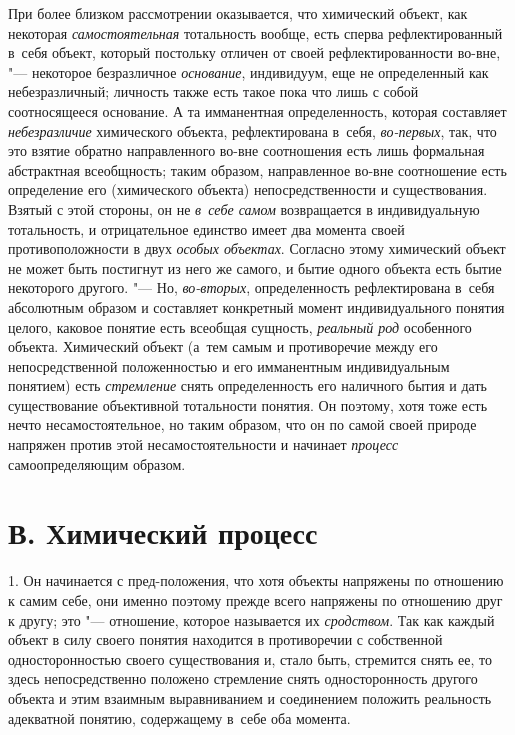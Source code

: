 При более близком рассмотрении оказывается, что химический
объект, как некоторая
{\em самостоятельная}
тотальность вообще, есть сперва рефлектированный в~себя
объект, который постольку отличен от своей рефлектированности во-вне, "---
некоторое безразличное
{\em основание},
индивидуум, еще не определенный как небезразличный; личность
также есть такое пока что лишь с собой соотносящееся
основание.
А та имманентная определенность, которая составляет
{\em небезразличие}
химического объекта, рефлектирована в~себя,
{\em во-первых}, так, что
это взятие обратно направленного во-вне соотношения есть лишь формальная
абстрактная всеобщность; таким образом, направленное во-вне соотношение
есть определение его (химического объекта) непосредственности и
существования. Взятый с этой стороны, он не
{\em в~себе самом}
возвращается в индивидуальную тотальность, и отрицательное
единство имеет два момента своей противоположности в двух
{\em особых объектах}.
Согласно этому химический объект не может быть постигнут из
него же самого, и бытие одного объекта есть бытие некоторого другого. "---
Но, {\em во-вторых},
определенность рефлектирована в~себя абсолютным образом и
составляет конкретный момент индивидуального понятия целого, каковое
понятие есть всеобщая сущность,
{\em реальный род}
особенного объекта. Химический объект (а~тем самым и
противоречие между его непосредственной положенностью и его имманентным
индивидуальным понятием) есть
{\em стремление} снять
определенность его наличного бытия и дать существование объективной
тотальности понятия. Он поэтому, хотя тоже есть нечто несамостоятельное, но
таким образом, что он по самой своей природе напряжен против этой
несамостоятельности и начинает
{\em процесс}
самоопределяющим образом.

\section[В. Химический процесс]{В. Химический процесс}
1. Он начинается с пред-положения, что хотя объекты напряжены
по отношению к самим себе, они именно поэтому прежде всего напряжены по
отношению друг к другу; это "--- отношение, которое называется
их {\em сродством}. Так
как каждый объект в силу своего понятия находится в противоречии с
собственной односторонностью своего существования и, стало быть, стремится
снять ее, то здесь непосредственно положено стремление снять
односторонность другого объекта и этим взаимным выравниванием и соединением
положить реальность адекватной понятию, содержащему в~себе оба момента.

